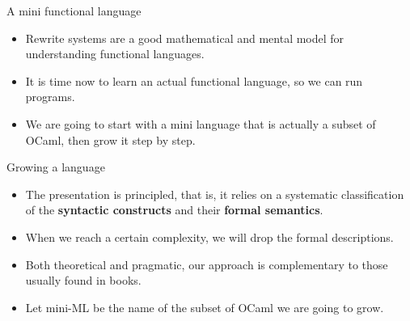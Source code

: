 \documentclass[compress,dvipdfmx]{beamer}
\newcommand{\OCaml}{\textsf{OCaml}\xspace}
\begin{document}
%
\begin{frame}{A mini functional language}

  \begin{itemize}

    \item Rewrite systems are a good mathematical and mental model for
      understanding functional languages.

    \item It is time now to learn an actual functional language, so we
      can run programs.

    \item We are going to start with a mini language that is actually
      a subset of \OCaml, then grow it step by step.

  \end{itemize}

\end{frame}

%
\begin{frame}{Growing a language}

  \begin{itemize}

    \item The presentation is principled, that is, it relies on a
      systematic classification of the \textbf{syntactic constructs}
      and their \textbf{formal semantics}.

    \item When we reach a certain complexity, we will drop the formal
      descriptions.

    \item Both theoretical and pragmatic, our approach is
      complementary to those usually found in books.


    \item Let mini-ML be the name of the subset of \OCaml we are going
      to grow.

  \end{itemize}
\end{frame}
\end{document}
